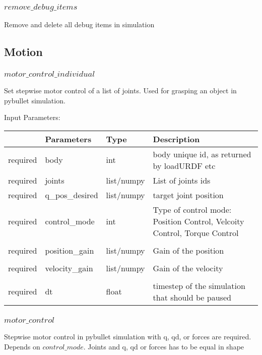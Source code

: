\documentclass[
	ngerman,
	accentcolor=9c,%
	type=intern,
	marginpar=false
	]{tudapub}
\begin{document}
\subsubsection{$remove\_debug\_items$}
\noindent  Remove and delete all debug items in simulation
\vspace{0.5cm}




\subsection{Motion}
\subsubsection{$motor\_control\_individual$}
\noindent Set stepwise motor control of a list of joints. Used for grasping an object in pybullet simulation. 



\vspace{0.5cm}
\noindent Input Parameters:
\vspace{0.5cm}

\begin{tabular}{|p{}|p{}|p{}| p{}|}
\hline
 & \textbf{Parameters} & \textbf{Type} & \textbf{Description} \\
\hline
required & body & int  & body unique id, as returned by loadURDF etc\\
\hline
required & joints & list/numpy  & List of joints ids \\
\hline
required & q\_pos\_desired & list/numpy  & target joint position\\
\hline
required & control\_mode & int  & Type of control mode: Position Control, Velcoity Control, Torque Control\\
\hline\\
required & position\_gain & list/numpy  & Gain of the position\\
\hline\\
required & velocity\_gain & list/numpy  & Gain of the velocity\\
\hline\\
required & dt & float  & timestep of the simulation that should be paused\\
\hline
\end{tabular}
\vspace{0.5cm}



\subsubsection{$motor\_control$}
\noindent Stepwise motor control in pybullet simulation with q, qd, or forces are required. Depends on $control\_mode$. Joints and q, qd or forces has to be equal in shape
\end{document}
